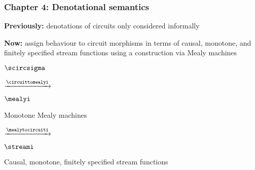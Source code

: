 \begin{frame}
    \frametitle{Chapter 4: Denotational semantics}

    \pause

    \textbf{Previously:} denotations of circuits only considered informally

    \pause

    \textbf{Now:} assign behaviour to circuit morphisms in terms of
    \alert{causal, monotone, and finitely specified stream functions} using
    a construction via \alert{Mealy machines}

    \pause

    \vspace{1em}

    \begin{center}
        \begin{minipage}{0.15\textwidth}
            \centering
            {\LARGE\(\scircsigma\)}
        \end{minipage}
        \pause
        \(\xrightarrow{\circuittomealyi}\)
        \begin{minipage}{0.25\textwidth}
            \centering
            {\LARGE\(\mealyi\)}

            \vspace{0.5em}

            \alert{Monotone} Mealy machines
        \end{minipage}
        \pause
        \(\xrightarrow{\mealytocircuiti}\)
        \begin{minipage}{0.375\textwidth}
            \centering
            {\LARGE\(\streami\)}

            \vspace{0.5em}

            \alert{Causal, monotone, finitely specified} stream functions
        \end{minipage}
    \end{center}

\end{frame}

